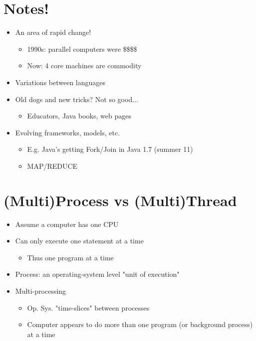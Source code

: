 \documentclass[12pt, a4paper]{book}
\begin{document}
\section{Notes!}
\begin{itemize}
    \item An area of rapid change!
          \begin{itemize}
              \item  1990s: parallel computers were \$\$\$\$
              \item Now: 4 core machines are commodity
          \end{itemize}
    \item  Variations between languages
    \item  Old dogs and new tricks? Not so good...
          \begin{itemize}
              \item  Educators, Java books, web pages
          \end{itemize}
    \item Evolving frameworks, models, etc.
          \begin{itemize}
              \item  E.g. Java's getting Fork/Join in Java 1.7 (summer 11)
              \item  MAP/REDUCE
          \end{itemize}
\end{itemize}

\section{(Multi)Process vs (Multi)Thread}
\begin{itemize}
    \item Assume a computer has one CPU
    \item Can only execute one statement at a time
          \begin{itemize}
              \item  Thus one program at a time
          \end{itemize}
    \item Process: an operating-system level "unit of execution"
    \item Multi-processing
          \begin{itemize}
              \item Op. Sys. "time-slices" between processes
              \item Computer appears to do more than one program (or background process) at a time
          \end{itemize}
\end{itemize}
\end{document}

